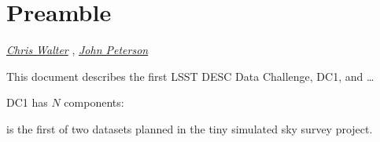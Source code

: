 \chapter*{Preamble}
\def\chpname{preamble}
\label{chp:\chpname}

\renewcommand{\contact}[2]{%
\href{https://github.com/DarkEnergyScienceCollaboration/DataChallenges/issues/new?title=Question:\%20\&body=#2:\%20}{{\it #1}}%
}

\contact{Chris Walter}{@cwwalter},
\contact{John Peterson}{@jrpeters}


This document describes the first LSST DESC Data Challenge, DC1,
and \ldots

DC1 has $N$ components:

\begin{description}

    \item{\TwinklesOne} is the first of two datasets planned in the
    \Twinkles tiny simulated sky survey project.

\end{description}


